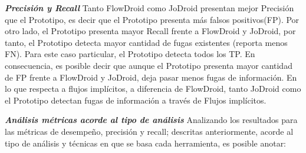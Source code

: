 \textbf{\textit{Precisión y Recall}}\newline
Tanto FlowDroid como JoDroid presentan mejor Precisión que el Prototipo, es
decir que el Prototipo presenta más falsos positivos(FP).\newline 
Por otro lado, el Prototipo presenta mayor Recall frente a FlowDroid y JoDroid,
por tanto, el Prototipo detecta mayor cantidad de fugas existentes (reporta
menos FN).
Para este caso particular, el Prototipo detecta todos los TP.\newline 
En consecuencia, es posible decir que aunque el Prototipo presenta mayor
cantidad de FP frente a FlowDroid y JoDroid, deja pasar menos fugas de
información.\newline
En lo que respecta a flujos implícitos, a diferencia de FlowDroid, tanto JoDroid
como el Prototipo detectan fugas de información a través de Flujos
implícitos.\newline

\textbf{\textit{Análisis métricas acorde al tipo de análisis}}\newline
Analizando los resultados para las métricas de desempeño, precisión y recall;
descritas anteriormente, acorde al tipo de análisis y técnicas en que se basa
cada herramienta, es posible anotar:\newline 

